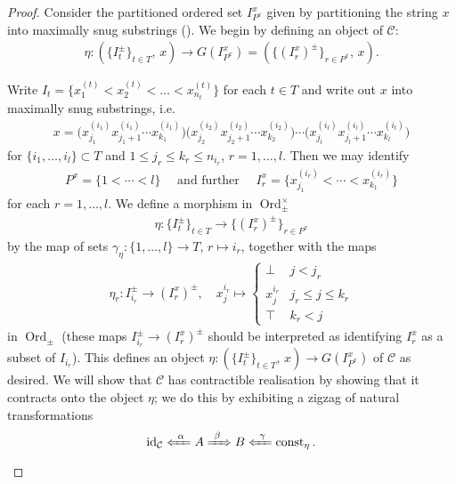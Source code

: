 \documentclass[12pt, reqno]{amsart}
\theoremstyle{plain}
\theoremstyle{definition}
\begin{document}
\begin{proof}
Consider the partitioned ordered set $I^x_{P^x}$ given by partitioning the string $x$ into maximally snug substrings (). We begin by defining an object of $\mathcal{C}$:
\begin{align*}
\eta\colon (\{I_t^\pm\}_{t\in T},\,x)\longrightarrow G(I^x_{P^x})= (\{(I^x_r)^\pm \}_{r\in P^x},\, x).
\end{align*}

Write $I_t=\{x_1^{(t)}<x_2^{(t)}<\ldots<x_{n_t}^{(t)}\}$ for each $t\in T$ and write out $x$ into maximally snug substrings, i.e.
\begin{align*}
x=\bigg(x_{j_1}^{(i_1)}x_{j_1+1}^{(i_1)}\cdots x_{k_1}^{(i_1)}\bigg)\bigg(x_{j_2}^{(i_2)}x_{j_2+1}^{(i_2)}\cdots x_{k_2}^{(i_2)}\bigg)\cdots \bigg(x_{j_l}^{(i_l)}x_{j_l+1}^{(i_l)}\cdots x_{k_l}^{(i_l)}\bigg)
\end{align*}
for $\{i_1,\ldots,i_l\}\subset T$ and $1\leq j_r\leq k_r\leq n_{i_r}$, $r=1,\ldots,l$. Then we may identify
\begin{align*}
P^x=\{1<\cdots <l\} \quad\text{ and further }\quad I^x_r=\{x_{j_1}^{(i_r)}<\cdots < x_{k_1}^{(i_r)}\}
\end{align*}
for each $r=1,\ldots,l$. We define a morphism in $\operatorname{Ord}_\pm^\times$
\begin{align*}
\eta\colon \{I_t^\pm\}_{t\in T}\rightarrow \{(I^x_r)^\pm \}_{r\in P^x}
\end{align*}
by the map of sets $\gamma_\eta\colon \{1,\ldots,l\}\rightarrow T$, $r\mapsto i_r$, together with the maps
\begin{align*}
\eta_r\colon I_{i_r}^\pm\rightarrow (I^x_r)^\pm,\quad x^{i_r}_j\mapsto \begin{cases}
\bot & j< j_r \\
x^{i_r}_j & j_r\leq j\leq k_r \\
\top & k_r< j
\end{cases}
\end{align*}
in $\operatorname{Ord}_\pm$ (these maps $I_{i_r}^\pm\rightarrow (I^x_r)^\pm$ should be interpreted as identifying $I^x_r$ as a subset of $I_{i_r}$). This defines an object $\eta\colon (\{I_t^\pm\}_{t\in T},\,x)\longrightarrow G(I^x_{P^x})$ of $\mathcal{C}$ as desired. We will show that $\mathcal{C}$ has contractible realisation by showing that it contracts onto the object $\eta$; we do this by exhibiting a zigzag of natural transformations
\begin{align*}
\operatorname{id}_\mathcal{C}\xLeftarrow{\ \alpha\ } A \xRightarrow{\ \beta\ } B  \xLeftarrow{\ \gamma\ } \operatorname{const}_\eta.

\end{align*}
\end{proof}
\end{document}
